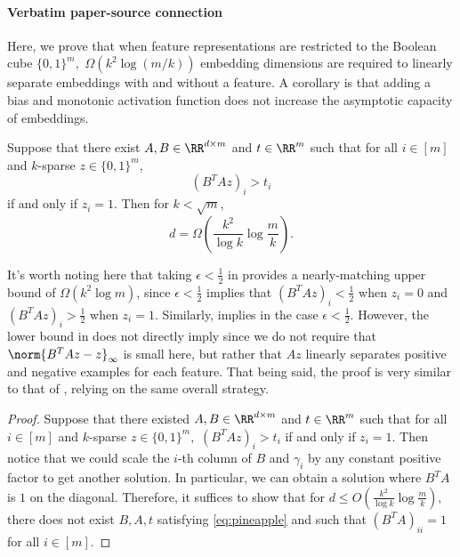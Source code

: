 \documentclass[10pt]{article}
\begin{document}
\paragraph{Verbatim paper-source connection}
\begin{ReviewVerbatim}
Here, we prove that when feature representations are restricted to the Boolean cube $\{0,1\}^m,$ $\Omega(k^2\log (m/k))$ embedding dimensions are required to linearly separate embeddings with and without a feature. A corollary is that adding a bias and monotonic activation function does not increase the asymptotic capacity of embeddings.

\begin{theorem}\label{thm:threshold}
    Suppose that there exist $A,B \in \RR^{d\times m}$ and $t\in \RR^m$ such that for all $i\in [m]$ and $k$-sparse $z\in \{0,1\}^m$,
    \begin{equation}\label{eq:pineapple}
        (B^TAz)_i > t_i
    \end{equation}
    if and only if $z_i=1.$ Then for $k < \sqrt{m}$,
    \begin{equation}
        d = \Omega\left(\frac{k^2}{\log k}\log\frac{m}{k}\right).
    \end{equation}
\end{theorem}
It's worth noting here that taking $\epsilon < \frac{1}{2}$ in  provides a nearly-matching upper bound of $\Omega(k^2\log m)$, since $\epsilon < \frac{1}{2}$ implies that $(B^TAz)_i < \frac{1}{2}$ when $z_i = 0$ and $(B^TAz)_i > \frac{1}{2}$ when $z_i = 1$. Similarly,  implies  in the case $\epsilon < \frac{1}{2}$. However, the lower bound in  does not directly imply  since we do not require that $\norm{B^TAz - z}_\infty$ is small here, but rather that $Az$ linearly separates positive and negative examples for each feature. That being said, the proof is very similar to that of , relying on the same overall strategy.

\begin{proof}
    Suppose that there existed $A,B\in \RR^{d\times m}$ and $t\in \RR^m$ such that for all $i\in [m]$ and $k$-sparse $z\in \{0,1\}^m,$ $(B^TAz)_i > t_i$ if and only if $z_i = 1.$ Then notice that we could scale the $i$-th column of $B$ and $\gamma_i$ by any constant positive factor to get another solution. In particular, we can obtain a solution where $B^TA$ is $1$ on the diagonal. Therefore, it suffices to show that for $d \le O(\frac{k^2}{\log k}\log \frac{m}{k}),$ there does not exist $B,A,t$ satisfying \eqref{eq:pineapple} and such that $(B^TA)_{ii} = 1$ for all $i\in [m].$


\end{proof}
\end{ReviewVerbatim}
\end{document}

